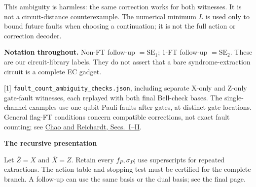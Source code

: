 \documentclass[11pt,a4paper]{article}
\newcommand{\dual}[1]{\ensuremath{\overline{#1}}}
\begin{document}
This ambiguity is harmless: the same correction works for both witnesses.
It is not a circuit-distance counterexample. The numerical minimum $L$ is
used only to bound future faults when choosing a continuation; it is not
the full action or correction decoder.

\textbf{Notation throughout.}
Non-FT follow-up $=\mathrm{SE}_1$;
1-FT follow-up $=\mathrm{SE}_2$.
These are our circuit-library labels. They do not assert that a bare
syndrome-extraction circuit is a complete EC gadget.

{\footnotesize
[1] \texttt{fault\_count\_ambiguity\_checks.json}, including separate X-only
and Z-only gate-fault witnesses, each replayed with both final Bell-check
bases. The single-channel examples use one-qubit Pauli faults after gates,
at distinct gate locations. General flag-FT conditions concern compatible
corrections, not exact fault counting; see
\href{https://arxiv.org/abs/1912.09549}{Chao and Reichardt, Secs.~I--II}.
}

\clearpage
{\LARGE\bfseries The recursive presentation}\par
Let $\dual Z=X$ and $\dual X=Z$. Retain every $f_P,\sigma_P$;
use superscripts for repeated extractions. The action table and stopping
test must be certified for the complete branch. A follow-up can use the
same basis or the dual basis; see the final page.
\end{document}
